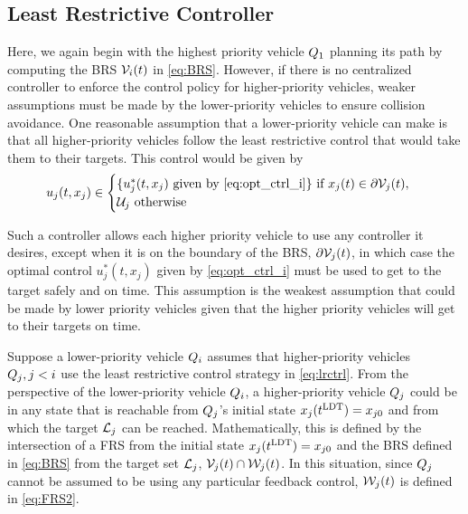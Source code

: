\subsection{Least Restrictive Controller}  \label{sec:incomp_LRctrl}
Here, we again begin with the highest priority vehicle $Q_{1}$ planning its path by computing the BRS $\mathcal{V}_i(t)$ in \eqref{eq:BRS}. However, if there is no centralized controller to enforce the control policy for higher-priority vehicles, weaker assumptions must be made by the lower-priority vehicles to ensure collision avoidance. One reasonable assumption that a lower-priority vehicle can make is that all higher-priority vehicles follow the least restrictive control that would take them to their targets. This control would be given by 
\vspace{-0.4em}
\begin{equation}
\label{eq:lrctrl} %
u_j(t, x_j)\in \begin{cases} \{u_j^*(t, x_j) \text{ given by } \eqref{eq:opt_ctrl_i}\} \text{ if } x_j(t)\in \partial \brs_j(t), \\
\cset_j  \text{ otherwise}
\end{cases}
\end{equation}

Such a controller allows each higher priority vehicle to use any controller it desires, except when it is on the boundary of the BRS, $\partial \mathcal{V}_j(t)$, in which case the optimal control $u_j^*(t, x_j)$ given by \eqref{eq:opt_ctrl_i} must be used to get to the target safely and on time. This assumption is the weakest assumption that could be made by lower priority vehicles given that the higher priority vehicles will get to their targets on time.

Suppose a lower-priority vehicle $Q_{i}$ assumes that higher-priority vehicles $Q_{j}, j < i$ use the least restrictive control strategy in \eqref{eq:lrctrl}. From the perspective of the lower-priority vehicle $Q_{i}$, a higher-priority vehicle $Q_{j}$ could be in any state that is reachable from $Q_{j}$'s initial state $x_j(t^\text{LDT}) = x_{j0}$ and from which the target $\mathcal{L}_j$ can be reached. Mathematically, this is defined by the intersection of a FRS from the initial state $x_j(t^\text{LDT})=x_{j0}$ and the BRS defined in \eqref{eq:BRS} from the target set $\mathcal{L}_j$, $\mathcal{V}_j(t) \cap \mathcal{W}_j(t)$. In this situation, since $Q_{j}$ cannot be assumed to be using any particular feedback control, $\mathcal{W}_j(t)$ is defined in \eqref{eq:FRS2}.
\vspace{-0.4em}

